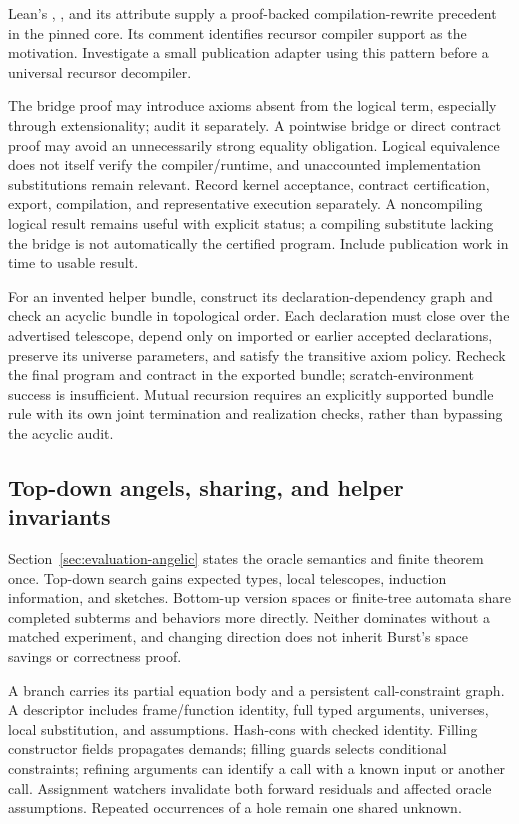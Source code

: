 Lean's , , and its
 attribute supply a proof-backed compilation-rewrite precedent
in the pinned core. Its comment identifies recursor compiler support as the
motivation. Investigate a small publication adapter using this pattern before
a universal recursor decompiler.\cite{leannat}

The bridge proof may introduce axioms absent from the logical term, especially
through extensionality; audit it separately. A pointwise bridge or direct
contract proof may avoid an unnecessarily strong equality obligation.
Logical equivalence does not itself verify the compiler/runtime, and
unaccounted implementation substitutions remain relevant. Record kernel
acceptance, contract certification, export, compilation, and representative
execution separately. A noncompiling logical result remains useful with
explicit status; a compiling substitute lacking the bridge is not automatically
the certified program. Include publication work in time to usable result.\cite{leancompile,leanvalidation}

For an invented helper bundle, construct its declaration-dependency graph
and check an acyclic bundle in topological order. Each declaration must close
over the advertised telescope, depend only on imported or earlier accepted
declarations, preserve its universe parameters, and satisfy the transitive
axiom policy. Recheck the final program and contract in the exported bundle;
scratch-environment success is insufficient. Mutual recursion requires an
explicitly supported bundle rule with its own joint termination and
realization checks, rather than bypassing the acyclic audit.

\subsection{Top-down angels, sharing, and helper invariants}\label{sec:recursion-angels}

Section~\ref{sec:evaluation-angelic} states the oracle semantics and finite
theorem once. Top-down search gains expected types, local telescopes, induction
information, and sketches. Bottom-up version spaces or finite-tree automata
share completed subterms and behaviors more directly. Neither dominates without
a matched experiment, and changing direction does not inherit Burst's space
savings or correctness proof.

A branch carries its partial equation body and a persistent call-constraint
graph. A descriptor includes frame/function identity, full typed arguments,
universes, local substitution, and assumptions. Hash-cons with checked identity.
Filling constructor fields propagates demands; filling guards selects
conditional constraints; refining arguments can identify a call with a known
input or another call. Assignment watchers invalidate both forward residuals
and affected oracle assumptions. Repeated occurrences of a hole remain one
shared unknown.

